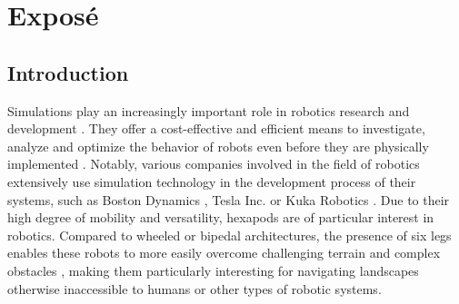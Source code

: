 \chapter{Exposé}
\label{ch:expose}



\section{Introduction}
Simulations play an increasingly important role in robotics research and development \parencite{afzal2020study}. 
They offer a cost-effective and efficient means to investigate, analyze and optimize the behavior of robots even before they are physically implemented \parencite{de2019analysis}. 
Notably, various companies involved in the field of robotics extensively use simulation technology in the development process of their systems, such as Boston Dynamics \parencite{BostonDynamicsSimulation}, Tesla Inc. \parencite{TeslaAiDay2022} or Kuka Robotics \parencite{KukaSim}.
Due to their high degree of mobility and versatility, hexapods are of particular interest in robotics. 
Compared to wheeled or bipedal architectures, the presence of six legs enables these robots to more easily overcome challenging terrain and complex obstacles \parencite{barai2013smart, atifystructure}, making them particularly interesting for navigating landscapes otherwise inaccessible to humans or other types of robotic systems.

